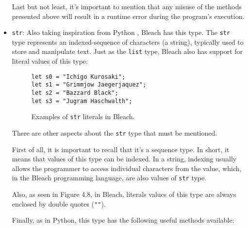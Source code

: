 \begin{itemize}
    Last but not least, it's important to mention that any misuse of the methods presented above will result in a runtime error during the program's execution.

    \item \texttt{str}: Also taking inspiration from Python \cite{python_language}, Bleach has this type. The \texttt{str} type represents an indexed-sequence of characters (a string), typically used to store and manipulate text. Just as the \texttt{list} type, Bleach also has support for literal values of this type:

    \begin{figure}[H]
        \centering
        \begin{lstlisting}
let s0 = "Ichigo Kurosaki";
let s1 = "Grimmjow Jaegerjaquez";
let s2 = "Bazzard Black";
let s3 = "Jugram Haschwalth";
        \end{lstlisting}
        \caption{Examples of \texttt{str} literals in Bleach.}
    \end{figure}

    There are other aspects about the \texttt{str} type that must be mentioned.

    First of all, it is important to recall that it's a sequence type. In short, it means that values of this type can be indexed. In a string, indexing usually allows the programmer to access individual characters from the value, which, in the Bleach programming language, are also values of \texttt{str} type.

    Also, as seen in Figure 4.8, in Bleach, literals values of this type are always enclosed by double quotes (\texttt{""}).

    Finally, as in Python, this type has the following useful methods available:


\end{itemize}

